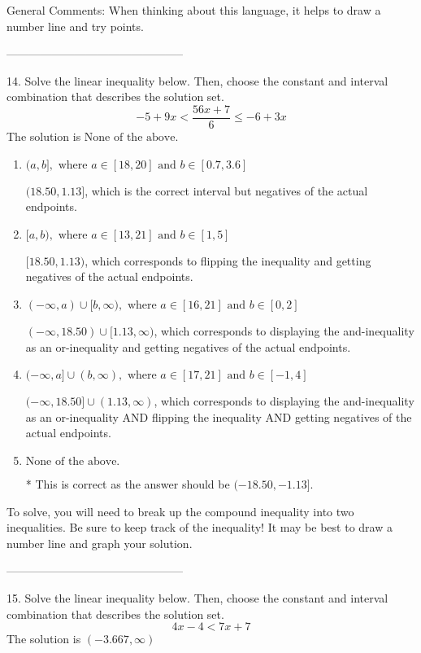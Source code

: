 \documentclass{article}[14pt]
\begin{document}
General Comments: When thinking about this language, it helps to draw a number line and try points.

-----------------------------------------------

14. Solve the linear inequality below. Then, choose the constant and interval combination that describes the solution set.
$$ -5 + 9 x < \frac{56 x + 7}{6} \leq -6 + 3 x $$ 
The solution is $ \text{None of the above.} $ 

\begin{enumerate}[label=\Alph*.] 
\item $ (a, b], \text{ where } a \in [18, 20] \text{ and } b \in [0.7, 3.6] $ 

 $(18.50, 1.13]$, which is the correct interval but negatives of the actual endpoints. 
\item $ [a, b), \text{ where } a \in [13, 21] \text{ and } b \in [1, 5] $ 

 $[18.50, 1.13)$, which corresponds to flipping the inequality and getting negatives of the actual endpoints. 
\item $ (-\infty, a) \cup [b, \infty), \text{ where } a \in [16, 21] \text{ and } b \in [0, 2] $ 

 $(-\infty, 18.50) \cup [1.13, \infty)$, which corresponds to displaying the and-inequality as an or-inequality and getting negatives of the actual endpoints. 
\item $ (-\infty, a] \cup (b, \infty), \text{ where } a \in [17, 21] \text{ and } b \in [-1, 4] $ 

 $(-\infty, 18.50] \cup (1.13, \infty)$, which corresponds to displaying the and-inequality as an or-inequality AND flipping the inequality AND getting negatives of the actual endpoints. 
\item $ \text{None of the above.} $ 

 * This is correct as the answer should be $(-18.50, -1.13]$. 
\end{enumerate} 
 
To solve, you will need to break up the compound inequality into two inequalities. Be sure to keep track of the inequality! It may be best to draw a number line and graph your solution.

-----------------------------------------------

15. Solve the linear inequality below. Then, choose the constant and interval combination that describes the solution set.
$$ 4x -4 < 7x + 7 $$ 
The solution is $ (-3.667, \infty) $ 
\end{document}
